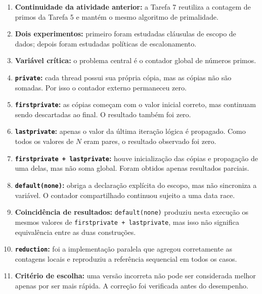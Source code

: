 \begin{enumerate}

    \item \textbf{Continuidade da atividade anterior:}
    a Tarefa 7 reutiliza a contagem de primos da Tarefa 5 e mantém o mesmo
    algoritmo de primalidade.

    \item \textbf{Dois experimentos:}
    primeiro foram estudadas cláusulas de escopo de dados; depois foram
    estudadas políticas de escalonamento.

    \item \textbf{Variável crítica:}
    o problema central é o contador global de números primos.

    \item \textbf{\texttt{private}:}
    cada thread possui sua própria cópia, mas as cópias não são somadas.
    Por isso o contador externo permaneceu zero.

    \item \textbf{\texttt{firstprivate}:}
    as cópias começam com o valor inicial correto, mas continuam sendo
    descartadas ao final. O resultado também foi zero.

    \item \textbf{\texttt{lastprivate}:}
    apenas o valor da última iteração lógica é propagado. Como todos os
    valores de \(N\) eram pares, o resultado observado foi zero.

    \item \textbf{\texttt{firstprivate + lastprivate}:}
    houve inicialização das cópias e propagação de uma delas, mas não soma
    global. Foram obtidos apenas resultados parciais.

    \item \textbf{\texttt{default(none)}:}
    obriga a declaração explícita do escopo, mas não sincroniza a variável.
    O contador compartilhado continuou sujeito a uma data race.

    \item \textbf{Coincidência de resultados:}
    \texttt{default(none)} produziu nesta execução os mesmos valores de
    \texttt{firstprivate + lastprivate}, mas isso não significa equivalência
    entre as duas construções.

    \item \textbf{\texttt{reduction}:}
    foi a implementação paralela que agregou corretamente as contagens
    locais e reproduziu a referência sequencial em todos os casos.

    \item \textbf{Critério de escolha:}
    uma versão incorreta não pode ser considerada melhor apenas por ser mais
    rápida. A correção foi verificada antes do desempenho.


\end{enumerate}
